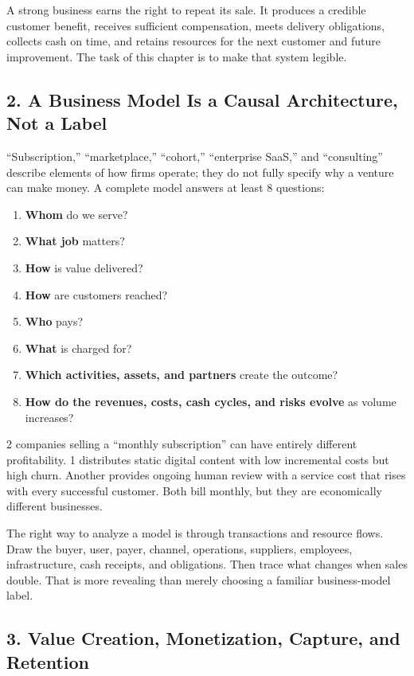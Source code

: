 A strong business earns the right to repeat its sale. It produces a credible customer benefit, receives sufficient compensation, meets delivery obligations, collects cash on time, and retains resources for the next customer and future improvement. The task of this chapter is to make that system legible.

\subsection*{2. A Business Model Is a Causal Architecture, Not a Label}

``Subscription,'' ``marketplace,'' ``cohort,'' ``enterprise SaaS,'' and ``consulting'' describe elements of how firms operate; they do not fully specify why a venture can make money. A complete model answers at least 8 questions:
\begin{enumerate}
  \item \textbf{Whom} do we serve?
  \item \textbf{What job} matters?
  \item \textbf{How} is value delivered?
  \item \textbf{How} are customers reached?
  \item \textbf{Who} pays?
  \item \textbf{What} is charged for?
  \item \textbf{Which activities, assets, and partners} create the outcome?
  \item \textbf{How do the revenues, costs, cash cycles, and risks evolve} as volume increases?
\end{enumerate}

2 companies selling a ``monthly subscription'' can have entirely different profitability. 1 distributes static digital content with low incremental costs but high churn. Another provides ongoing human review with a service cost that rises with every successful customer. Both bill monthly, but they are economically different businesses.

The right way to analyze a model is through transactions and resource flows. Draw the buyer, user, payer, channel, operations, suppliers, employees, infrastructure, cash receipts, and obligations. Then trace what changes when sales double. That is more revealing than merely choosing a familiar business-model label.

\subsection*{3. Value Creation, Monetization, Capture, and Retention}

